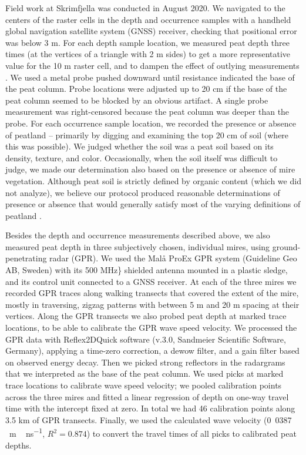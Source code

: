 \documentclass[soil, manuscript]{copernicus}
\begin{document}
Field work at Skrimfjella was conducted in August 2020.
We navigated to the centers of the raster cells in the depth and occurrence samples with a handheld global navigation satellite system (GNSS) receiver, checking that positional error was below 3 m.
For each depth sample location, we measured peat depth three times (at the vertices of a triangle with 2 m sides) to get a more representative value for the 10 m raster cell, and to dampen the effect of outlying measurements \citep{parryEvaluatingApproachesEstimating2014}.
We used a metal probe pushed downward until resistance indicated the base of the peat column.
Probe locations were adjusted up to 20 cm if the base of the peat column seemed to be blocked by an obvious artifact.
A single probe measurement was right-censored because the peat column was deeper than the probe.
For each occurrence sample location, we recorded the presence or absence of peatland -- primarily by digging and examining the top 20 cm of soil (where this was possible).
We judged whether the soil was a peat soil based on its density, texture, and color.
Occasionally, when the soil itself was difficult to judge, we made our determination also based on the presence or absence of mire vegetation.
Although peat soil is strictly defined by organic content (which we did not analyze), we believe our protocol produced reasonable determinations of presence or absence that would generally satisfy most of the varying definitions of peatland \citep{minasnyMappingMonitoringPeatland2023}.

Besides the depth and occurrence measurements described above, we also measured peat depth in three subjectively chosen, individual mires, using ground-penetrating radar (GPR).
We used the Malå ProEx GPR system (Guideline Geo AB, Sweden) with its 500 MHz\} shielded antenna mounted in a plastic sledge, and its control unit connected to a GNSS receiver.
At each of the three mires we recorded GPR traces along walking transects that covered the extent of the mire, mostly in traversing, zigzag patterns with between 5 m and 20 m spacing at their vertices.
Along the GPR transects we also probed peat depth at marked trace locations, to be able to calibrate the GPR wave speed velocity.
We processed the GPR data with Reflex2DQuick software (v.3.0, Sandmeier Scientific Software, Germany), applying a time-zero correction, a dewow filter, and a gain filter based on observed energy decay.
Then we picked strong reflectors in the radargrams that we interpreted as the base of the peat column.
We used picks at marked trace locations to calibrate wave speed velocity; we pooled calibration points across the three mires and fitted a linear regression of depth on one-way travel time with the intercept fixed at zero.
In total we had 46 calibration points along 3.5 km of GPR transects.
Finally, we used the calculated wave velocity (\unit{0.0387\,m\,ns^{-1}}, \(R^2 = 0.874\)) to convert the travel times of all picks to calibrated peat depths.
\end{document}
